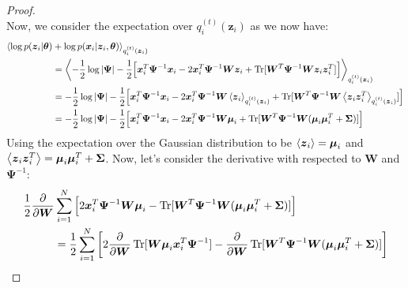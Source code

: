 \begin{proof}
\begin{equation*}
    \end{equation*}
    Now, we consider the expectation over $q^{(t)}_i(\boldsymbol z_i)$ as we now have:
    \begin{equation*}
    \begin{aligned}
        \langle\log p(\boldsymbol z_i | \boldsymbol \theta) &+ \log p(\boldsymbol x_i | \boldsymbol z_i, \boldsymbol \theta)\rangle_{q^{(t)}_i(\boldsymbol z_i)} \\
        &= \left\langle -\frac{1}{2}\log\left| \boldsymbol \Psi \right| - \frac{1}{2}\Big[ \boldsymbol x_i^T\boldsymbol \Psi^{-1}\boldsymbol x_i - 2\boldsymbol x_i^T\boldsymbol \Psi^{-1}\boldsymbol W\boldsymbol z_i + \operatorname{Tr}[\boldsymbol W^T\boldsymbol \Psi^{-1}\boldsymbol W\boldsymbol z_i\boldsymbol z_i^T] \Big] \right\rangle_{q^{(t)}_i(\boldsymbol z_i)} \\
        &= -\frac{1}{2}\log\left| \boldsymbol \Psi \right| - \frac{1}{2}\Big[ \boldsymbol x_i^T\boldsymbol \Psi^{-1}\boldsymbol x_i - 2\boldsymbol x_i^T\boldsymbol \Psi^{-1}\boldsymbol W\left\langle \boldsymbol z_i \right\rangle_{q^{(t)}_i(\boldsymbol z_i)} + \operatorname{Tr}[\boldsymbol W^T\boldsymbol \Psi^{-1}\boldsymbol W\left\langle \boldsymbol z_i\boldsymbol z_i^T \right\rangle_{q^{(t)}_i(\boldsymbol z_i)}] \Big] \\
        &= -\frac{1}{2}\log\left| \boldsymbol \Psi \right| - \frac{1}{2}\Big[ \boldsymbol x_i^T\boldsymbol \Psi^{-1}\boldsymbol x_i - 2\boldsymbol x_i^T\boldsymbol \Psi^{-1}\boldsymbol W\boldsymbol \mu_i + \operatorname{Tr}[\boldsymbol W^T\boldsymbol \Psi^{-1}\boldsymbol W(\boldsymbol \mu_i\boldsymbol \mu_i^T + \boldsymbol \Sigma)] \Big] \\
    \end{aligned}
    \end{equation*}
    Using the expectation over the Gaussian distribution to be $\left\langle \boldsymbol z_i \right\rangle = \boldsymbol \mu_i$ and $\left\langle \boldsymbol z_i\boldsymbol z_i^T \right\rangle = \boldsymbol \mu_i\boldsymbol \mu_i^T + \boldsymbol \Sigma$. Now, let's consider the derivative with respected to $\boldsymbol W$ and $\boldsymbol \Psi^{-1}$:
    \begin{equation*}
    \begin{aligned}
        \frac{1}{2}\frac{\partial}{\partial\boldsymbol W} &\sum_{i=1}^N \Big[2\boldsymbol x_i^T\boldsymbol \Psi^{-1}\boldsymbol W\boldsymbol \mu_i - \operatorname{Tr}[\boldsymbol W^T\boldsymbol \Psi^{-1}\boldsymbol W(\boldsymbol \mu_i\boldsymbol \mu_i^T + \boldsymbol \Sigma)] \Big] \\
        &= \frac{1}{2}\sum_{i=1}^N \brackb{2\frac{\partial}{\partial\boldsymbol W}\operatorname{Tr}[\boldsymbol W\boldsymbol \mu_i\boldsymbol x_i^T\boldsymbol \Psi^{-1}] - \frac{\partial}{\partial\boldsymbol W}\operatorname{Tr}[\boldsymbol W^T\boldsymbol \Psi^{-1}\boldsymbol W(\boldsymbol \mu_i\boldsymbol \mu_i^T + \boldsymbol \Sigma)] } \\

\end{aligned}
\end{equation*}
\end{proof}
